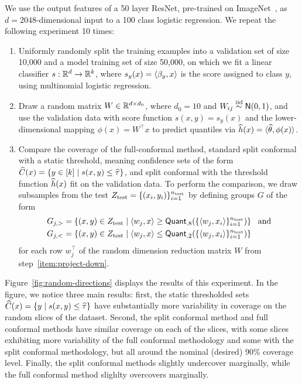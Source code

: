\documentclass{article}
\newcommand{\scorefunc}{s}
\newcommand{\scoreval}{\scorefunc}
\newcommand{\quant}{\mathsf{Quant}}
\begin{document}
We use the output features of a 50 layer ResNet, pre-trained
on ImageNet~\cite{HeZhReSu16, HeZhReSu16b},
as $d = 2048$-dimensional input to a 100 class
logistic regression.
%
We repeat the following experiment 10 times:
\begin{enumerate}[1.]
\item Uniformly randomly split the training examples into a validation set
  of size 10,000 and a model training set of size 50,000, on which we fit a
  linear classifier $\scorefunc : \R^d \to \R^k$, where $\scorefunc_y(x) =
  \<\beta_y, x\>$ is the score assigned to class $y$, using multinomial
  logistic regression.
\item \label{item:project-down}
  Draw a random matrix $W \in \mathbb{R}^{d \times d_0}$, where
  $d_0 = 10$ and $W_{ij} \stackrel{\rm iid}{\sim} \mathsf{N}(0, 1)$,
  and use the validation data with score function
  $\scorefunc(x, y) = \scorefunc_y(x)$ and the lower-dimensional
  mapping $\phi(x) = W^\top x$
  to predict quantiles via $\widehat{h}(x) = \langle\widehat{\theta}, \phi(x)\rangle$.
\item Compare the coverage of the full-conformal method,
  standard split conformal with a static threshold,
  meaning confidence sets of the form
  $\what{C}(x) = \{y \in [k] \mid \scorefunc(x, y) \le \what{\tau}\}$,
  and split conformal with the threshold function
  $\widehat{h}(x)$ fit on the validation data.
  To perform the comparison, we draw subsamples from the test
  $Z_{\textup{test}} = \{(x_i, y_i)\}_{i = 1}^{n_{\textup{test}}}$
  by defining groups $G$ of the form
  \begin{align*}
    G_{j,>} & = \left\{(x, y) \in Z_{\textup{test}}
    \mid  \<w_j, x\> \ge \quant_{.8}(\{\<w_j, x_i\>\}_{i = 1}^{n_{\textup{test}}})
    \right\} ~~ \mbox{and} \\
    G_{j,<} & = \left\{(x, y) \in Z_{\textup{test}}
    \mid  \<w_j, x\> \le \quant_{.2}(\{\<w_j, x_i\>\}_{i = 1}^{n_{\textup{test}}})
    \right\}
  \end{align*}
  for each row $w_j^\top$ of the random dimension reduction matrix
  $W$ from step~\ref{item:project-down}.
\end{enumerate}

Figure~\ref{fig:random-directions} displays the results of this experiment.
%
In the figure, we notice three main results: first, the static thresholded
sets $\what{C}(x) = \{y \mid \scoreval(x, y) \le \what{\tau}\}$ have
substantially more variability in coverage on the random slices of the
dataset.
%
Second, the split conformal method and full conformal methods have
similar coverage on each of the slices, with some
slices exhibiting more variability of the full conformal methodology
and some with the split conformal methodology, but all
around the nominal (desired) 90\% coverage level.
%
Finally, the split conformal methods slightly undercover marginally,
while the full conformal method slighlty overcovers marginally.
\end{document}
